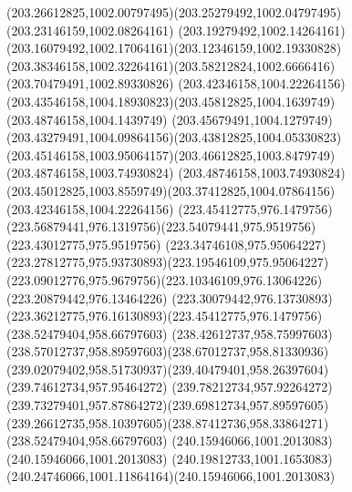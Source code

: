 {{		\curveto(203.26612825,1002.00797495)(203.25279492,1002.04797495)(203.23146159,1002.08264161)
		\curveto(203.19279492,1002.14264161)(203.16079492,1002.17064161)(203.12346159,1002.19330828)
		\curveto(203.38346158,1002.32264161)(203.58212824,1002.6666416)(203.70479491,1002.89330826)
		\moveto(203.42346158,1004.22264156)
		\curveto(203.43546158,1004.18930823)(203.45812825,1004.1639749)(203.48746158,1004.1439749)
		\curveto(203.45679491,1004.1279749)(203.43279491,1004.09864156)(203.43812825,1004.05330823)
		\curveto(203.45146158,1003.95064157)(203.46612825,1003.8479749)(203.48746158,1003.74930824)
		\lineto(203.48746158,1003.74930824)
		\curveto(203.45012825,1003.8559749)(203.37412825,1004.07864156)(203.42346158,1004.22264156)
		\moveto(223.45412775,976.1479756)
		\curveto(223.56879441,976.1319756)(223.54079441,975.9519756)(223.43012775,975.9519756)
		\curveto(223.34746108,975.95064227)(223.27812775,975.93730893)(223.19546109,975.95064227)
		\curveto(223.09012776,975.9679756)(223.10346109,976.13064226)(223.20879442,976.13464226)
		\curveto(223.30079442,976.13730893)(223.36212775,976.16130893)(223.45412775,976.1479756)
		\moveto(238.52479404,958.66797603)
		\curveto(238.42612737,958.75997603)(238.57012737,958.89597603)(238.67012737,958.81330936)
		\curveto(239.02079402,958.51730937)(239.40479401,958.26397604)(239.74612734,957.95464272)
		\curveto(239.78212734,957.92264272)(239.73279401,957.87864272)(239.69812734,957.89597605)
		\curveto(239.26612735,958.10397605)(238.87412736,958.33864271)(238.52479404,958.66797603)
		\moveto(240.15946066,1001.2013083)
		\lineto(240.15946066,1001.2013083)
		\curveto(240.19812733,1001.1653083)(240.24746066,1001.11864164)(240.15946066,1001.2013083)
	}
}
